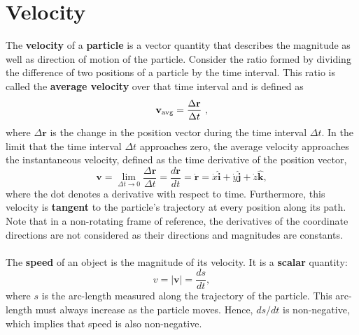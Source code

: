 \section{Velocity}
The \textbf{velocity} of a \textbf{particle} is a vector quantity that describes the magnitude as well as direction of motion of the particle. Consider the ratio formed by dividing the difference of two positions of a particle by the time interval. This ratio is called the \textbf{average velocity} over that time interval and is defined as
\[
\mathbf{v}_{\rm {avg}} = \frac{\Delta\mathbf{r}}{\Delta t}\ ,
\]
where $\Delta\mathbf{r}$ is the change in the position vector during the time interval $\Delta t$. In the limit that the time interval $\Delta t$ approaches zero, the average velocity approaches the instantaneous velocity, defined as the time derivative of the position vector,
\[
\mathbf{v} = \lim _{\Delta t\to 0}\frac{\Delta\mathbf{r}}{\Delta t} = \frac{d\mathbf {r}}{dt} = \dot{\mathbf{r}} = \dot{x}\hat{\mathbf{i}} + \dot{y}\hat{\mathbf{j}} + \dot {z}\hat{\mathbf{k}},
\]
where the dot denotes a derivative with respect to time. Furthermore, this velocity is \textbf{tangent} to the particle's trajectory at every position along its path. Note that in a non-rotating frame of reference, the derivatives of the coordinate directions are not considered as their directions and magnitudes are constants.
\\\\
The \textbf{speed} of an object is the magnitude of its velocity. It is a \textbf{scalar} quantity:
\[
v = |\mathbf{v}| = \frac{ds}{dt},
\]
where $s$ is the arc-length measured along the trajectory of the particle. This arc-length must always increase as the particle moves. Hence, $ds/dt$ is non-negative, which implies that speed is also non-negative.


